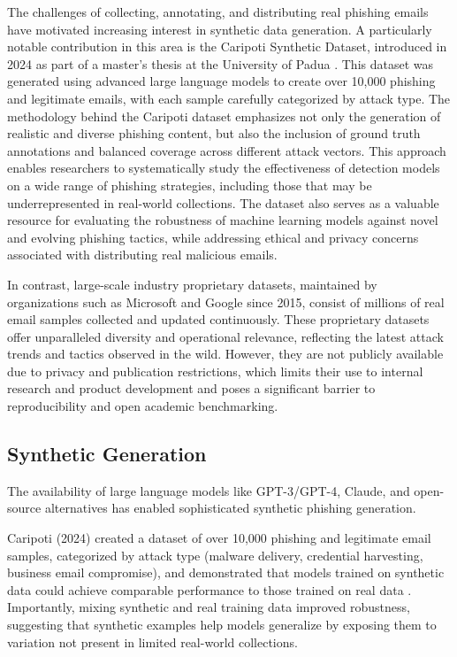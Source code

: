 The challenges of collecting, annotating, and distributing real phishing emails have motivated increasing interest in synthetic data generation. A particularly notable contribution in this area is the Caripoti Synthetic Dataset, introduced in 2024 as part of a master's thesis at the University of Padua \cite{caripoti2024synthetic}. This dataset was generated using advanced large language models to create over 10,000 phishing and legitimate emails, with each sample carefully categorized by attack type. The methodology behind the Caripoti dataset emphasizes not only the generation of realistic and diverse phishing content, but also the inclusion of ground truth annotations and balanced coverage across different attack vectors. This approach enables researchers to systematically study the effectiveness of detection models on a wide range of phishing strategies, including those that may be underrepresented in real-world collections. The dataset also serves as a valuable resource for evaluating the robustness of machine learning models against novel and evolving phishing tactics, while addressing ethical and privacy concerns associated with distributing real malicious emails. 

In contrast, large-scale industry proprietary datasets, maintained by organizations such as Microsoft and Google since 2015, consist of millions of real email samples collected and updated continuously. These proprietary datasets offer unparalleled diversity and operational relevance, reflecting the latest attack trends and tactics observed in the wild. However, they are not publicly available due to privacy and publication restrictions, which limits their use to internal research and product development and poses a significant barrier to reproducibility and open academic benchmarking.

\subsection{Synthetic Generation}

The availability of large language models like GPT-3/GPT-4, Claude, and open-source alternatives has enabled sophisticated synthetic phishing generation.

Caripoti (2024) created a dataset of over 10,000 phishing and legitimate email samples, categorized by attack type (malware delivery, credential harvesting, business email compromise), and demonstrated that models trained on synthetic data could achieve comparable performance to those trained on real data \cite{caripoti2024synthetic}. Importantly, mixing synthetic and real training data improved robustness, suggesting that synthetic examples help models generalize by exposing them to variation not present in limited real-world collections.

